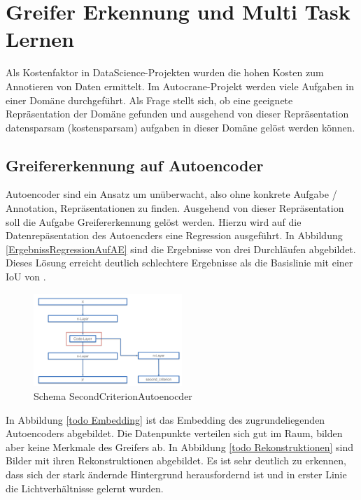 
\chapter{Greifer Erkennung und Multi Task Lernen}
\label{chap:HauptteilMultiTaskLernen}
Als Kostenfaktor in DataScience-Projekten wurden die hohen Kosten zum Annotieren von Daten ermittelt. Im Autocrane-Projekt werden viele Aufgaben in einer Domäne durchgeführt. Als Frage stellt sich, ob eine geeignete Repräsentation der Domäne gefunden und ausgehend von dieser Repräsentation datensparsam (kostensparsam) aufgaben in dieser Domäne gelöst werden können.  


	\section{Greifererkennung auf Autoencoder}
	\label{sec:GreifererkennungAufAutoencoder}
    Autoencoder sind ein Ansatz um unüberwacht, also  ohne konkrete Aufgabe / Annotation, Repräsentationen zu finden. Ausgehend von dieser Repräsentation soll die  Aufgabe Greifererkennung gelöst werden. Hierzu wird auf die Datenrepäsentation des Autoencders eine Regression ausgeführt. In Abbildung \ref{ErgebnissRegressionAufAE} sind die Ergebnisse von drei Durchläufen abgebildet. Dieses Lösung erreicht deutlich schlechtere Ergebnisse als die Basislinie mit einer IoU von .
	\begin{figure}[h]
		\centering
		\includegraphics[width=0.5\textwidth, center]{bilder/Schema_Autoencoders/Schema_SCAE.png}
		\caption[Schema SecondCriterionAutoenocder]{Schema SecondCriterionAutoenocder}
		\label{img:ErgebnissRegressionAufAE}
	\end{figure}  
	In Abbildung \ref{todo Embedding} ist das Embedding des zugrundeliegenden Autoencoders abgebildet. Die Datenpunkte verteilen sich gut im Raum, bilden aber keine Merkmale des Greifers ab. In Abbildung \ref{todo Rekonstruktionen} sind Bilder mit ihren Rekonstruktionen abgebildet. Es ist sehr deutlich zu erkennen, dass sich der stark ändernde Hintergrund herausfordernd ist und in erster Linie die Lichtverhältnisse gelernt wurden.   
	
